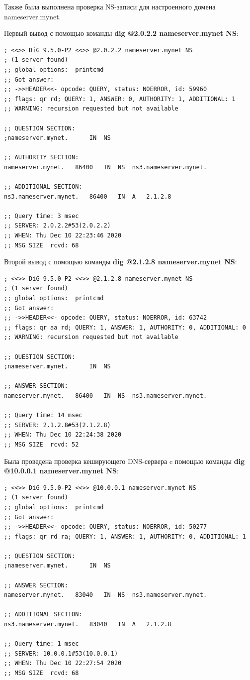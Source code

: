 \documentclass[a4paper,12pt]{article}
\begin{document}
Также была выполнена проверка NS-записи для настроенного домена nameserver.mynet.

Первый вывод с помощью команды \textbf{dig @2.0.2.2 nameserver.mynet NS}:
\begin{verbatim}
; <<>> DiG 9.5.0-P2 <<>> @2.0.2.2 nameserver.mynet NS
; (1 server found)
;; global options:  printcmd
;; Got answer:
;; ->>HEADER<<- opcode: QUERY, status: NOERROR, id: 59960
;; flags: qr rd; QUERY: 1, ANSWER: 0, AUTHORITY: 1, ADDITIONAL: 1
;; WARNING: recursion requested but not available

;; QUESTION SECTION:
;nameserver.mynet.		IN	NS

;; AUTHORITY SECTION:
nameserver.mynet.	86400	IN	NS	ns3.nameserver.mynet.

;; ADDITIONAL SECTION:
ns3.nameserver.mynet.	86400	IN	A	2.1.2.8

;; Query time: 3 msec
;; SERVER: 2.0.2.2#53(2.0.2.2)
;; WHEN: Thu Dec 10 22:23:46 2020
;; MSG SIZE  rcvd: 68
\end{verbatim}

Второй вывод с помощью команды \textbf{dig @2.1.2.8 nameserver.mynet NS}:
\begin{verbatim}
; <<>> DiG 9.5.0-P2 <<>> @2.1.2.8 nameserver.mynet NS
; (1 server found)
;; global options:  printcmd
;; Got answer:
;; ->>HEADER<<- opcode: QUERY, status: NOERROR, id: 63742
;; flags: qr aa rd; QUERY: 1, ANSWER: 1, AUTHORITY: 0, ADDITIONAL: 0
;; WARNING: recursion requested but not available

;; QUESTION SECTION:
;nameserver.mynet.		IN	NS

;; ANSWER SECTION:
nameserver.mynet.	86400	IN	NS	ns3.nameserver.mynet.

;; Query time: 14 msec
;; SERVER: 2.1.2.8#53(2.1.2.8)
;; WHEN: Thu Dec 10 22:24:38 2020
;; MSG SIZE  rcvd: 52
\end{verbatim}

Была проведена проверка кеширующего DNS-сервера c помощью команды \textbf{dig @10.0.0.1 nameserver.mynet NS}:
\begin{verbatim}
; <<>> DiG 9.5.0-P2 <<>> @10.0.0.1 nameserver.mynet NS
; (1 server found)
;; global options:  printcmd
;; Got answer:
;; ->>HEADER<<- opcode: QUERY, status: NOERROR, id: 50277
;; flags: qr rd ra; QUERY: 1, ANSWER: 1, AUTHORITY: 0, ADDITIONAL: 1

;; QUESTION SECTION:
;nameserver.mynet.		IN	NS

;; ANSWER SECTION:
nameserver.mynet.	83040	IN	NS	ns3.nameserver.mynet.

;; ADDITIONAL SECTION:
ns3.nameserver.mynet.	83040	IN	A	2.1.2.8

;; Query time: 1 msec
;; SERVER: 10.0.0.1#53(10.0.0.1)
;; WHEN: Thu Dec 10 22:27:54 2020
;; MSG SIZE  rcvd: 68
\end{verbatim}
\end{document}
